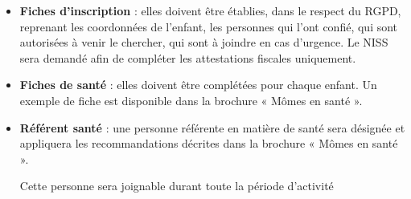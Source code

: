 \begin{itemize}
\item \textbf{Fiches d’inscription} : elles doivent être établies, dans le respect du RGPD, reprenant les coordonnées de l’enfant, les personnes qui l’ont confié, qui sont autorisées à venir le chercher, qui sont à joindre en cas d’urgence. Le NISS sera demandé afin de compléter les attestations fiscales uniquement.

\item \textbf{Fiches de santé} : elles doivent être complétées pour chaque enfant. Un exemple de fiche est disponible dans la brochure « Mômes en santé ».
\item \textbf{Référent santé} : une personne référente en matière de santé sera désignée et appliquera les recommandations décrites dans la brochure « Mômes en santé ».

Cette personne sera joignable durant toute la période d’activité

\end{itemize}



